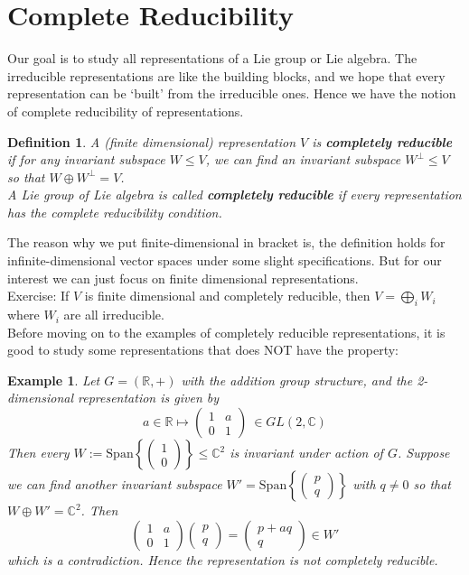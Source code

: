 \documentclass[11pt]{book}
\newtheorem{example}[theorem]{Example}
\newtheorem{definition}[theorem]{Definition}
\newcommand{\bb}[1]{\mathbb{#1}}
\begin{document}
\section{Complete Reducibility}
Our goal is to study all representations of a Lie group or Lie algebra. The irreducible representations are like the building blocks, and we hope that every representation can be `built' from the irreducible ones. Hence we have the notion of complete reducibility of representations.
\begin{definition}
A (finite dimensional) representation $V$ is \textbf{completely reducible} if for any invariant subspace $W \leq V$, we can find an invariant subspace $W^{\perp} \leq V$ so that $W \oplus W^{\perp} = V$.\\
A Lie group of Lie algebra is called \textbf{completely reducible} if every representation has the complete reducibility condition.
\end{definition}
The reason why we put finite-dimensional in bracket is, the definition holds for infinite-dimensional vector spaces under some slight specifications. But for our interest we can just focus on finite dimensional representations.\\
Exercise: If $V$ is finite dimensional and completely reducible, then $V = \bigoplus_i W_i$ where $W_i$ are all irreducible.\\
Before moving on to the examples of completely reducible representations, it is good to study some representations that does NOT have the property:
\begin{example}
Let $G = (\bb{R},+)$ with the addition group structure, and the 2-dimensional representation is given by
$$a \in \bb{R} \mapsto \left( \begin{array}{cc}
 1 & a\\
0 & 1 \end{array} \right)\ \in GL(2,\bb{C})$$
Then every $W := \mathrm{Span}\left\{\left( \begin{array}{c}
 1 \\
0  \end{array} \right)\right\} \leq \bb{C}^2$ is invariant under action of $G$. Suppose we can find another invariant subspace $W' = \mathrm{Span}\left\{\left( \begin{array}{c}
 p \\
q  \end{array} \right)\right\}$ with $q \neq 0$ so that $W \oplus W' = \bb{C}^2$. Then
$$\left( \begin{array}{cc}
 1 & a \\
0 & 1  \end{array} \right)\left( \begin{array}{c}
 p \\
q  \end{array} \right) = \left( \begin{array}{c}
 p+aq \\
q  \end{array} \right) \in W'$$
which is a contradiction. Hence the representation is not completely reducible.
\end{example}
\end{document}
